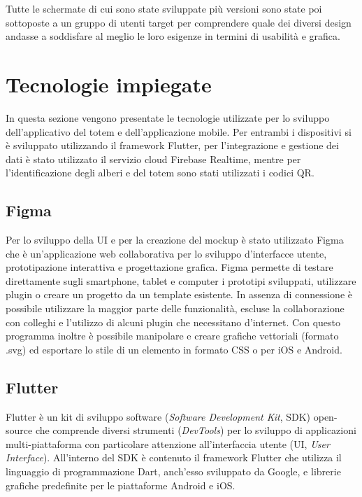 Tutte le schermate di cui sono state sviluppate più versioni sono state poi sottoposte a un gruppo di utenti target per comprendere quale dei diversi design andasse a soddisfare al meglio le loro esigenze in termini di usabilità e grafica.

%
%
%
\newpage
\section{Tecnologie impiegate}
In questa sezione vengono presentate le tecnologie utilizzate per lo sviluppo dell'applicativo del totem e dell'applicazione mobile. Per entrambi i dispositivi si è sviluppato utilizzando il framework Flutter, per l'integrazione e gestione dei dati è stato utilizzato il servizio cloud Firebase Realtime, mentre per l'identificazione degli alberi e del totem sono stati utilizzati i codici QR.

\subsection{Figma}
Per lo sviluppo della UI e per la creazione del mockup è stato utilizzato Figma \cite{figma} che è un'applicazione web collaborativa per lo sviluppo d'interfacce utente, prototipazione interattiva e progettazione grafica.
Figma permette di testare direttamente sugli smartphone, tablet e computer i prototipi sviluppati, utilizzare plugin o creare un progetto da un template esistente. In assenza di connessione è possibile utilizzare la maggior parte delle funzionalità, escluse la collaborazione con colleghi e l'utilizzo di alcuni plugin che necessitano d'internet.
 Con questo programma inoltre è possibile manipolare e creare grafiche vettoriali (formato .svg) ed esportare lo stile di un elemento in formato CSS o per iOS e Android.

\subsection{Flutter}
Flutter \cite{flutter} è un kit di sviluppo software (\textit{Software Development Kit}, SDK) open-source che comprende diversi strumenti (\textit{DevTools}) per lo sviluppo di applicazioni multi-piattaforma con particolare attenzione all'interfaccia utente (UI, \textit{User Interface}). All'interno del SDK è contenuto il framework Flutter che utilizza il linguaggio di programmazione Dart, anch'esso sviluppato da Google, e librerie grafiche predefinite per le piattaforme Android e iOS.


